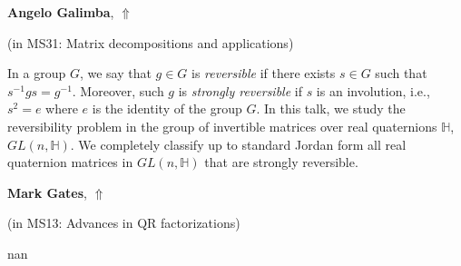 \documentclass[ILAS2025-program.tex]{subfiles}
\begin{document}
\hypertarget{down0274}{}\begin{ilasabstract}
    
\textbf{Angelo Galimba},  \hfill \hyperlink{up0274}{$\Uparrow$}
    
    
(in {\color{mstitle}MS31: Matrix decompositions and applications})
        
\mtskip
    In a group $G$, we say that $g \in G$ is \emph{reversible} if there exists $s \in G$ such that $s^{-1}gs = g^{-1}$. Moreover, such $g$ is \emph{strongly reversible} if $s$ is an involution, i.e., $s^2 = e$ where $e$ is the identity of the group $G$. In this talk, we study the reversibility problem in the group of invertible matrices over real quaternions $\mathbb{H}$, $GL(n, \mathbb{H})$. We completely classify up to standard Jordan form all real quaternion matrices in $GL(n,\mathbb{H})$ that are strongly reversible.
\end{ilasabstract}
    

\hypertarget{down0341}{}\begin{ilasabstract}
    
\textbf{Mark Gates},  \hfill \hyperlink{up0341}{$\Uparrow$}
    
    
(in {\color{mstitle}MS13: Advances in QR factorizations})
        
\mtskip
    nan
\end{ilasabstract}
    
\end{document}

